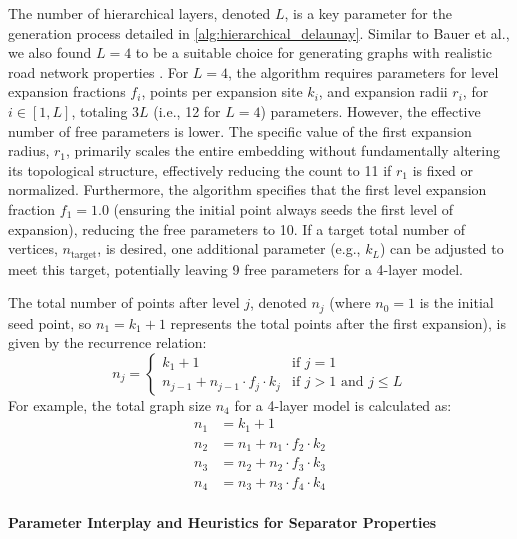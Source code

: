 The number of hierarchical layers, denoted \(L\), is a key parameter for the generation process detailed in \cref{alg:hierarchical_delaunay}.
Similar to Bauer et al., we also found \(L=4\) to be a suitable choice for generating graphs with realistic road network properties \cite{hutchison_synthetic_2010}.
For \(L=4\), the algorithm requires parameters for level expansion fractions \(f_i\), points per expansion site \(k_i\), and expansion radii \(r_i\), for \(i \in [1, L]\), totaling \(3L\) (i.e., 12 for \(L=4\)) parameters.
However, the effective number of free parameters is lower.
The specific value of the first expansion radius, \(r_1\), primarily scales the entire embedding without fundamentally altering its topological structure, effectively reducing the count to 11 if \(r_1\) is fixed or normalized.
Furthermore, the algorithm specifies that the first level expansion fraction \(f_1 = 1.0\) (ensuring the initial point always seeds the first level of expansion), reducing the free parameters to 10.
If a target total number of vertices, \(n_{\text{target}}\), is desired, one additional parameter (e.g., \(k_L\)) can be adjusted to meet this target, potentially leaving 9 free parameters for a 4-layer model.

The total number of points after level \(j\), denoted \(n_j\) (where \(n_0=1\) is the initial seed point, so \(n_1 = k_1 + 1\) represents the total points after the first expansion), is given by the recurrence relation:
\[
	n_j =
	\begin{cases}
		k_1 + 1                               & \text{if } j=1                        \\
		n_{j-1} + n_{j-1} \cdot f_j \cdot k_j & \text{if } j > 1 \text{ and } j \le L
	\end{cases}
\]
For example, the total graph size \(n_4\) for a 4-layer model is calculated as:
\begin{align*}
	n_1 & = k_1 + 1                       \\
	n_2 & = n_1 + n_1 \cdot f_2 \cdot k_2 \\
	n_3 & = n_2 + n_2 \cdot f_3 \cdot k_3 \\
	n_4 & = n_3 + n_3 \cdot f_4 \cdot k_4
\end{align*}

\paragraph{Parameter Interplay and Heuristics for Separator Properties}

